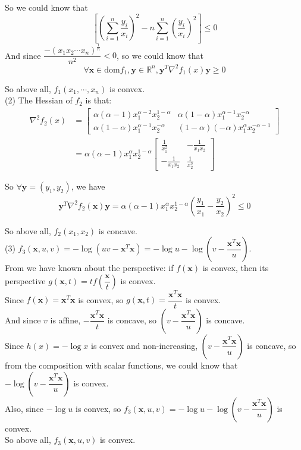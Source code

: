 \documentclass[10pt]{article}
\renewcommand{\mathbf}{\boldsymbol}
\begin{document}
\begin{enumerate}
So we could know that 
$$\left[\left(\sum_{i=1}^n\dfrac{y_i}{x_i}\right)^2-n\sum_{i=1}^n\left(\dfrac{y_i}{x_i}\right)^2\right]\leq 0$$
And since $\dfrac{-(x_1x_2\cdots x_n)^{\frac{1}{n}}}{n^2}<0$, so we could know that
$$\forall\mathbf{x}\in\text{dom} f_1,\mathbf{y}\in\mathbb{R}^n, \mathbf{y}^T\nabla^2 f_1(x)\mathbf{y}\geq 0$$

So above all, $f_1(x_1,\cdots,x_n)$ is convex.\\


(2) The Hessian of $f_2$ is that:
\begin{align*}
\nabla^2 f_2(x) & =\left[\begin{array}{cc}
\alpha(\alpha-1) x_1^{\alpha-2} x_2^{1-\alpha} & \alpha(1-\alpha) x_1^{\alpha-1} x_2^{-\alpha} \\
\alpha(1-\alpha) x_1^{\alpha-1} x_2^{-\alpha} & (1-\alpha)(-\alpha) x_1^\alpha x_2^{-\alpha-1}
\end{array}\right] \\
& =\alpha(\alpha-1) x_1^\alpha x_2^{1-\alpha}
\left[\begin{array}{cc}
\frac{1}{x_1^2} & -\frac{1}{x_1x_2} \\
-\frac{1}{x_1x_2} & \frac{1}{x_2^2}
\end{array}\right]
\end{align*}

So $\forall\mathbf{y}=(y_1,y_2)$, we have
$$\mathbf{y}^T\nabla^2f_2(\mathbf{x})\mathbf{y}=\alpha(\alpha-1) x_1^\alpha x_2^{1-\alpha}\left(\dfrac{y_1}{x_1}-\dfrac{y_2}{x_2}\right)^2\leq 0$$

So above all, $f_2(x_1,x_2)$ is concave.\\


(3) $f_3(\mathbf{x}, u, v)=-\log(uv-\mathbf{x}^T\mathbf{x})=-\log u-\log \left(v-\dfrac{\mathbf{x}^T\mathbf{x}}{u}\right)$.\\
From we have known about the perspective: if $f(\mathbf{x})$ is convex, then its perspective $g(\mathbf{x},t)=tf\left(\dfrac{\mathbf{x}}{t}\right)$ is convex.\\
Since $f(\mathbf{x})=\mathbf{x}^T\mathbf{x}$ is convex, so $g(\mathbf{x},t)=\dfrac{\mathbf{x}^T\mathbf{x}}{t}$ is convex.\\
And since $v$ is affine, $-\dfrac{\mathbf{x}^T\mathbf{x}}{t}$ is concave, so $\left(v-\dfrac{\mathbf{x}^T\mathbf{x}}{u}\right)$ is concave.\\

Since $h(x)=-\log x$ is convex and non-increasing, $\left(v-\dfrac{\mathbf{x}^T\mathbf{x}}{u}\right)$ is concave, so from the composition with scalar functions, we could know that
$-\log \left(v-\dfrac{\mathbf{x}^T\mathbf{x}}{u}\right)$ is convex.\\

Also, since $-\log u$ is convex, so $f_3(\mathbf{x}, u, v)=-\log u-\log \left(v-\dfrac{\mathbf{x}^T\mathbf{x}}{u}\right)$ is convex.\\

So above all, $f_3(\mathbf{x}, u, v)$ is convex.\\

\end{enumerate}
\end{document}
